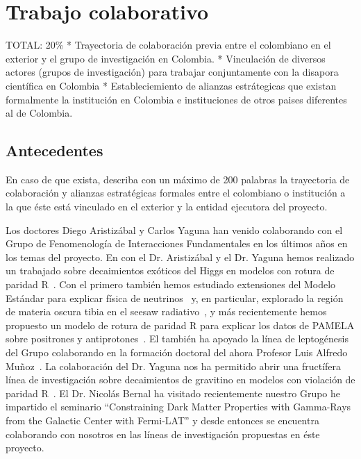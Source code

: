 
\section{Trabajo colaborativo}
\begin{evaluacion}
  TOTAL: 20\% 
  * Trayectoria de colaboración previa entre el colombiano
  en el exterior y el grupo de investigación en Colombia.
  * Vinculación de diversos actores (grupos de investigación) para
  trabajar conjuntamente con la disapora científica en Colombia
  * Estableciemiento de alianzas estrátegicas que existan formalmente
  la institución en Colombia e instituciones de otros paises
  diferentes al de Colombia.
\end{evaluacion}

\subsection{Antecedentes}
\begin{instrucciones}
  En caso de que exista, describa con un máximo de 200 palabras la
  trayectoria de colaboración y alianzas estratégicas formales entre
  el colombiano o institución a la que éste está vinculado en el
  exterior y la entidad ejecutora del proyecto.  
\end{instrucciones}
Los doctores Diego Aristizábal y Carlos Yaguna han venido colaborando
con el Grupo de Fenomenología de Interacciones Fundamentales en los
últimos años en los temas del proyecto. En con el Dr. Aristizábal y el
Dr. Yaguna hemos realizado un trabajado sobre decaimientos exóticos
del Higgs en modelos con rotura de
paridad R~\cite{AristizabalSierra:2008ye}. Con el primero también
hemos estudiado extensiones del Modelo Estándar para explicar física
de neutrinos~\cite{AristizabalSierra:2006ri,Sierra:2008wj} y, en particular, explorado la región de materia oscura tibia en el seesaw
radiativo~\cite{Sierra:2008wj}, y más recientemente hemos propuesto un
modelo de rotura de paridad R para explicar los datos de PAMELA sobre
positrones y antiprotones~\cite{Sierra:2009zq}. El también ha apoyado
la línea de leptogénesis del Grupo colaborando en la formación
doctoral del ahora Profesor Luis Alfredo
Muñoz~\cite{AristizabalSierra:2009bh,AristizabalSierra:2009mq,Sierra:2009bm,AristizabalSierra:2009bh,AristizabalSierra:2007ur,Aristizabal:2003zn}. La
colaboración del Dr. Yaguna nos ha permitido abrir una fructífera
línea de investigación sobre decaimientos de gravitino en modelos con
violación de paridad R~\cite{Choi:2010jt}. El Dr. Nicolás Bernal ha
visitado recientemente nuestro Grupo he impartido el seminario
``Constraining Dark Matter Properties with Gamma-Rays from the
Galactic Center with Fermi-LAT'' y desde entonces se encuentra
colaborando con nosotros en las líneas de investigación propuestas en
éste proyecto.

